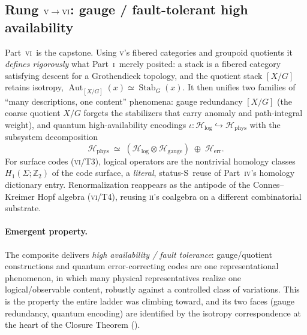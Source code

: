\documentclass[12pt]{article}
\theoremstyle{definition}
\theoremstyle{remark}
\newcommand{\Aut}{\operatorname{Aut}}
\newcommand{\Stab}{\operatorname{Stab}}
\newcommand{\Sstat}{\textsf{S}}
\newcommand{\Ho}{\mathcal{H}}
\newcommand{\Hphys}{\Ho_{\mathrm{phys}}}
\newcommand{\Hlog}{\Ho_{\mathrm{log}}}
\newcommand{\Hgauge}{\Ho_{\mathrm{gauge}}}
\newcommand{\Herr}{\Ho_{\mathrm{err}}}
\newcommand{\ZZ}{\mathbb{Z}}
\newcommand{\PI}{\textsc{i}}
\newcommand{\PII}{\textsc{ii}}
\newcommand{\PIV}{\textsc{iv}}
\newcommand{\PV}{\textsc{v}}
\newcommand{\PVI}{\textsc{vi}}
\begin{document}
\subsection{Rung \texorpdfstring{$\PV\to\PVI$}{V to VI}: gauge / fault-tolerant high availability}
\label{sec:rung6}

Part~\PVI\ is the capstone.  Using \PV's fibered categories and groupoid quotients it
\emph{defines rigorously} what Part~\PI\ merely posited: a stack is a fibered category
satisfying descent for a Grothendieck topology, and the quotient stack $[X/G]$ retains
isotropy, $\Aut_{[X/G]}(x)\simeq\Stab_G(x)$.  It then unifies two families of
``many descriptions, one content'' phenomena: gauge redundancy $[X/G]$ (the coarse
quotient $X/G$ forgets the stabilizers that carry anomaly and path-integral weight),
and quantum high-availability encodings $\iota:\Hlog\hookrightarrow\Hphys$ with the
subsystem decomposition
\begin{equation}
\label{eq:qha}
\Hphys\;\simeq\;(\Hlog\otimes\Hgauge)\;\oplus\;\Herr .
\end{equation}
For surface codes (\PVI/T3), logical operators are the nontrivial homology classes
$H_1(\Sigma;\ZZ_2)$ of the code surface, a \emph{literal}, status-\Sstat\ reuse of
Part~\PIV's homology dictionary entry.  Renormalization reappears as the antipode of
the Connes--Kreimer Hopf algebra (\PVI/T4), reusing \PII's coalgebra on a different
combinatorial substrate.

\paragraph{Emergent property.}
The composite delivers \emph{high availability / fault tolerance}: gauge/quotient
constructions and quantum error-correcting codes are one representational phenomenon,
in which many physical representatives realize one logical/observable content, robustly
against a controlled class of variations.  This is the property the entire ladder was
climbing toward, and its two faces (gauge redundancy, quantum encoding) are identified
by the isotropy correspondence at the heart of the Closure Theorem
().
\end{document}
